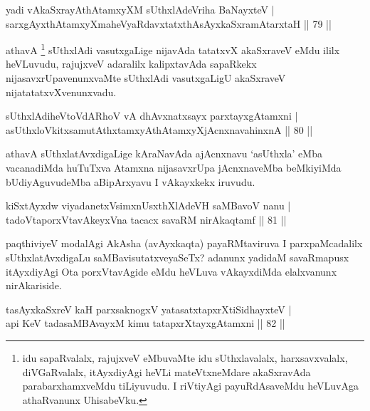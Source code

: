 \begin{shl}
yadi vA\s kaSxrayAthAtamxyXM sUthxlAdeVriha BaNayxteV |\\
sarxgAyxthAtamxyXmaheVyaRdavxtatxthA\s sAyxkaSxramAtarxtaH \hfill || 79 ||
\end{shl}

\begin{artha}
athavA \footnote{idu sapaRvalalx, rajujxveV eMbuvaMte idu sUthxlavalalx, harxsavxvalalx, diVGaRvalalx, itAyxdiyAgi heVLi mateVtxneMdare akaSxravAda parabarxhamxveMdu tiLiyuvudu. I riVtiyAgi payuRdAsaveMdu heVLuvAga athaRvanunx UhisabeVku.} sUthxlAdi vasutxgaLige nijavAda tatatxvX akaSxraveV eMdu ililx heVLuvudu, rajujxveV adaralilx kalipxtavAda sapaRkekx nijasavxrUpavenunxvaMte sUthxlAdi vasutxgaLigU akaSxraveV nijatatatxvXvenunxvadu.
\end{artha}

\begin{shl}
sUthxlAdiheVtoVdARhoV vA dhAvxnatxsayx parxtayxgAtamxni |\\
asUthxloVkitxsamutAthxtamxyAthAtamxyXjAcnxnavahinxnA \hfill || 80 ||
\end{shl}

\begin{artha}
athavA sUthxlatAvxdigaLige kAraNavAda ajAcnxnavu `asUthxla' eMba vacanadiMda huTuTxva Atamxna nijasavxrUpa jAcnxnaveMba beMkiyiMda bUdiyAguvudeMba aBipArxyavu I vAkayxkekx iruvudu.
\end{artha}


\begin{shl}
kiSxtAyxdw viyadanetxV\s simxnUsxthXlAdeVH saMBavoV nanu |\\
tadoVtaporxVtavAkeyxVna tacacx savaRM nirAkaqtamf \hfill || 81 ||
\end{shl}

\begin{artha}%
paqthiviyeV modalAgi AkAsha (avAyxkaqta) payaRMtaviruva I parxpaMcadalilx sUthxlatAvxdigaLu saMBavisutatxveyaSeTx? adanunx yadidaM savaRmapusx itAyxdiyAgi Ota porxVtavAgide eMdu heVLuva vAkayxdiMda elalxvanunx nirAkariside.
\end{artha}


\begin{shl}
tasAyxkaSxreV kaH parxsaknogxV yatasatxtapxrXtiSidhayxteV |\\
api KeV tadasaMBAvayxM kimu tatapxrXtayxgAtamxni \hfill || 82 ||
\end{shl}

